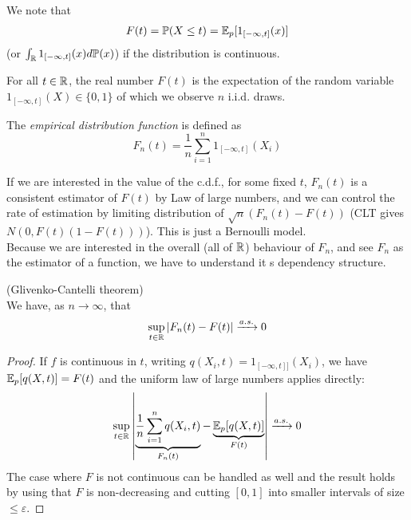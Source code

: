 \documentclass[a4paper]{article}
\begin{document}
\begin{rem}
We note that
\begin{equation*}
\begin{aligned}
F(t) = \mathbb{P}(X \leq t) = \mathbb{E}_p [1_{[-\infty,t]}(x)]
\end{aligned}
\end{equation*}
(or $\int_{\mathbb{R}} 1_{[-\infty,t]} (x) d\mathbb{P}(x)$) if the distribution is continuous.

For all $t \in \mathbb{R}$, the real number $F(t)$ is the expectation of the random variable $1_{[-\infty,t]}(X) \in \{0,1\}$ of which we observe $n$ i.i.d. draws.
\end{rem}

\begin{defi}
The \emph{empirical distribution function} is defined as $$F_n(t) = \frac{1}{n} \sum_{i=1}^n 1_{[-\infty,t]}(X_i)$$
\end{defi}

\begin{rem}
If we are interested in the value of the c.d.f., for some fixed $t$, $F_n(t)$ is a consistent estimator of $F(t)$ by Law of large numbers, and we can control the rate of estimation by limiting distribution of $\sqrt{n} (F_n(t) - F(t))$ (CLT gives $N(0,F(t) (1-F(t)))$). This is just a Bernoulli model.\\
Because we are interested in the overall (all of $\mathbb{R}$) behaviour of $F_n$, and see $F_n$ as the estimator of a function, we have to understand it s dependency structure.
\end{rem}

\begin{thm} (Glivenko-Cantelli theorem)\\
We have, as $n \to \infty$, that $$\sup_{t \in \mathbb{R}} |F_n(t) - F(t)| \xrightarrow{a.s.} 0$$
\begin{proof}
If $f$ is continuous in $t$, writing $q(X_i,t) = 1_{[-\infty,t]]}(X_i)$, we have $\mathbb{E}_p [q(X,t)] = F(t)$ and the uniform law of large numbers applies directly: $$\sup_{t \in \mathbb{R}} \left| \underbrace{\frac{1}{n} \sum_{i=1}^n q(X_i,t)}_{F_n(t)} - \underbrace{\mathbb{E}_p [q(X,t)]}_{F(t)}\right| \xrightarrow{a.s.} 0$$ The case where $F$ is not continuous can be handled as well and the result holds by using that $F$ is non-decreasing and cutting $[0,1]$ into smaller intervals of size $\leq \varepsilon$.
\end{proof}
\end{thm}
\end{document}
